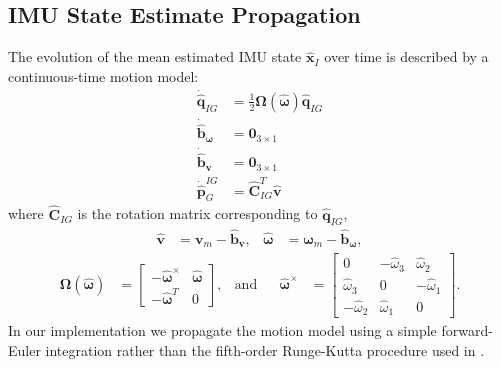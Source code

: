 \documentclass[letterpaper, 10 pt, conference]{ieeeconf}  %
\def\Vec#1{\mathbf{#1}}
\newcommand{\bbm}{\begin{bmatrix}}
\newcommand{\ebm}{\end{bmatrix}}
\begin{document}
\subsection{IMU State Estimate Propagation}
The evolution of the mean estimated IMU state $\hat{\Vec{x}}_I$ over time is described by a continuous-time motion model:
\begin{align}
    \dot{\hat{\Vec{q}}}_{IG} &= \frac{1}{2}\boldsymbol{\Omega}\left(\hat{\boldsymbol{\omega}}\right)\hat{\Vec{q}}_{IG} \\
    \dot{\hat{\Vec{b}}}_{\boldsymbol{\omega}}  &= \Vec{0}_{3\times1} \\
    \dot{\hat{\Vec{b}}}_{\Vec{v}} &= \Vec{0}_{3\times1} \\
    \dot{\hat{\Vec{p}}}^{IG}_G &= \hat{\Vec{C}}_{I G}^T \hat{\Vec{v}}
\end{align}
where $\hat{\Vec{C}}_{I G}$ is the rotation matrix corresponding to $\hat{\Vec{q}}_{IG}$,
\begin{align*}
    \hat{\Vec{v}} &= \Vec{v}_m - \hat{\Vec{b}}_{\Vec{v}}, & \hat{\boldsymbol{\omega}} &= \boldsymbol{\omega}_m - \hat{\Vec{b}}_{\boldsymbol{\omega}},
\end{align*}
\begin{align*}
    \boldsymbol{\Omega}\left(\hat{\boldsymbol{\omega}}\right) &= \bbm -\hat{\boldsymbol{\omega}}^\times & \hat{\boldsymbol{\omega}} \\
                                                                -\hat{\boldsymbol{\omega}}^T & 0
                                                            \ebm ,
                                                            & \text{and} &&
    \hat{\boldsymbol{\omega}}^\times &=   \bbm    0 & -\hat{\omega}_3 & \hat{\omega}_2 \\
                                                \hat{\omega}_3 & 0 & -\hat{\omega}_1 \\
                                                -\hat{\omega}_2 & \hat{\omega}_1 & 0
                                            \ebm .
\end{align*}
In our implementation we propagate the motion model using a simple forward-Euler integration rather than the fifth-order Runge-Kutta procedure used in \cite{Mourikis:2007:ICRA}.
\end{document}
